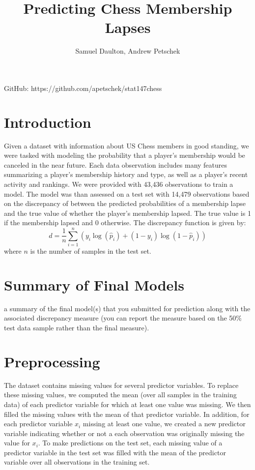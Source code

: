 \documentclass[12pt]{article}
\author{Samuel Daulton, Andrew Petschek}
\title{Predicting Chess Membership Lapses}
\begin{document}
\maketitle
\begin{center}
GitHub: https://github.com/apetschek/stat147chess
\end{center}

\newpage
\section*{Introduction}
Given a dataset with information about US Chess members in good standing, we were tasked with modeling the probability that a player's membership would be canceled in the near future.  Each data observation includes many features summarizing a player's membership history and type, as well as a player's recent activity and rankings.  We were provided with 43,436 observations to train a model.  The model was than assessed on a test set with 14,479 observations based on the discrepancy of between the predicted probabilities of a membership lapse and the true value of whether the player's membership lapsed.  The true value is 1 if the membership lapsed and 0 otherwise.  The discrepancy function is given by:
$$d = \frac{1}{n}\sum_{i=1}^{n}\left(y_i\log(\hat{p}_i)+(1-y_i)\log(1-\hat{p}_i)\right)$$
where $n$ is the number of samples in the test set.
\section*{Summary of Final Models}
a summary of the final model(s) that you submitted for prediction along with the associated discrepancy measure (you can report the measure based on the 50\% test data sample rather than the final measure).
\section*{Preprocessing}
The dataset contains missing values for several predictor variables.  To replace these missing values, we computed the mean (over all samples in the training data) of each predictor variable for which at least one value was missing.  We then filled the missing values with the mean of that predictor variable.  In addition, for each predictor variable $x_i$ missing at least one value, we created a new predictor variable indicating whether or not a each observation was originally missing the value for $x_i$.  To make predictions on the test set, each missing value of a predictor variable in the test set was filled with the mean of the predictor variable over all observations in the training set.
\end{document}
